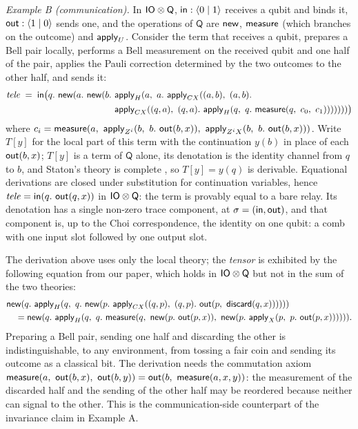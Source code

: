 \emph{Example B (communication).} In $\mathsf{IO}\otimes\mathsf{Q}$, $\mathsf{in}: \langle 0 \mid 1\rangle$ receives a qubit and binds it, $\mathsf{out}: \langle 1\mid 0\rangle$ sends one, and the operations of $\mathsf{Q}$ are $\mathsf{new}$, $\mathsf{measure}$ (which branches on the outcome) and $\mathsf{apply}_{U}$. Consider the term that receives a qubit, prepares a Bell pair locally, performs a Bell measurement on the received qubit and one half of the pair, applies the Pauli correction determined by the two outcomes to the other half, and sends it:
\begin{align*}
\mathit{tele} \;=\; \opin\big(q.\ \opnew(a.\ \opnew(b.\ &\applyU{H}(a,\ a.\ \applyU{CX}((a,b),\ (a,b).\\
&\applyU{CX}((q,a),\ (q,a).\ \applyU{H}(q,\ q.\ \opmeasure(q,\ c_{0},\ c_{1})))))))\big)
\end{align*}
where $c_{i} = \opmeasure(a,\ \applyU{Z^{i}}(b,\ b.\ \opout(b, x)),\ \applyU{Z^{i}X}(b,\ b.\ \opout(b, x)))$. Write $T[y]$ for the local part of this term with the continuation $y(b)$ in place of each $\mathsf{out}(b,x)$; $T[y]$ is a term of $\mathsf{Q}$ alone, its denotation is the identity channel from $q$ to $b$, and Staton's theory is complete \cite{statonpopl15}, so $T[y] = y(q)$ is derivable. Equational derivations are closed under substitution for continuation variables, hence $\mathit{tele} = \mathsf{in}(q.\ \mathsf{out}(q, x))$ in $\mathsf{IO}\otimes\mathsf{Q}$: the term is provably equal to a bare relay. Its denotation has a single non-zero trace component, at $\sigma=(\mathsf{in},\mathsf{out})$, and that component is, up to the Choi correspondence, the identity on one qubit: a comb with one input slot followed by one output slot.

The derivation above uses only the local theory; the \emph{tensor} is exhibited by the following equation from our paper, which holds in $\mathsf{IO}\otimes\mathsf{Q}$ but not in the sum of the two theories:
\begin{align*}
&\opnew(q.\ \applyU{H}(q,\ q.\ \opnew(p.\ \applyU{CX}((q,p),\ (q,p).\ \opout(p,\ \mathsf{discard}(q, x))))))\\
&\quad = \opnew(q.\ \applyU{H}(q,\ q.\ \opmeasure(q,\ \opnew(p.\ \opout(p, x)),\ \opnew(p.\ \applyU{X}(p,\ p.\ \opout(p, x)))))).
\end{align*}
Preparing a Bell pair, sending one half and discarding the other is indistinguishable, to any environment, from tossing a fair coin and sending its outcome as a classical bit. The derivation needs the commutation axiom $\mathsf{measure}(a,\ \mathsf{out}(b,x),\ \mathsf{out}(b,y)) = \mathsf{out}(b,\ \mathsf{measure}(a,x,y))$: the measurement of the discarded half and the sending of the other half may be reordered because neither can signal to the other. This is the communication-side counterpart of the invariance claim in Example A.

